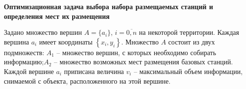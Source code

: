 














\textbf{Оптимизационная задача выбора набора размещаемых станций и определения мест их размещения}

Задано множество вершин $A = \{a_i\}$, $i=\overline{0,n}$ на некоторой территории. Каждая вершина $a_i$ имеет координаты $\left\{ x_i, y_i \right\}$. Множество $A$ состоит из двух подмножеств:  $A_1$ -- множество вершин, с которых необходимо собирать информацию;$A_2$ -- множество возможных мест размещения базовых станций. Каждой вершине $a_i$ приписана   величина $v_i$ -- максимальный объем информации, снимаемой с объекта, расположенного на этой вершине.

